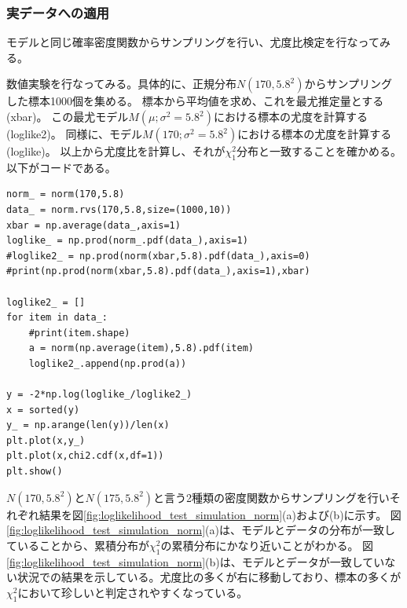 \subsubsection{実データへの適用}
モデルと同じ確率密度関数からサンプリングを行い、尤度比検定を行なってみる。

数値実験を行なってみる。具体的に、正規分布$N(170,5.8^2)$からサンプリングした標本1000個を集める。
標本から平均値を求め、これを最尤推定量とする(xbar)。
この最尤モデル$M(\mu;\sigma^2=5.8^2) $における標本の尤度を計算する(loglike2)。
同様に、モデル$M(170;\sigma^2=5.8^2)$における標本の尤度を計算する(loglike)。
以上から尤度比を計算し、それが$\chi^2_1$分布と一致することを確かめる。
以下がコードである。

\begin{lstlisting}
norm_ = norm(170,5.8)
data_ = norm.rvs(170,5.8,size=(1000,10))
xbar = np.average(data_,axis=1)
loglike_ = np.prod(norm_.pdf(data_),axis=1)
#loglike2_ = np.prod(norm(xbar,5.8).pdf(data_),axis=0)
#print(np.prod(norm(xbar,5.8).pdf(data_),axis=1),xbar)

loglike2_ = []
for item in data_:
    #print(item.shape)
    a = norm(np.average(item),5.8).pdf(item)
    loglike2_.append(np.prod(a))

y = -2*np.log(loglike_/loglike2_)
x = sorted(y)
y_ = np.arange(len(y))/len(x)
plt.plot(x,y_)
plt.plot(x,chi2.cdf(x,df=1))
plt.show()

\end{lstlisting}

$N(170,5.8^2)$と$N(175,5.8^2)$と言う2種類の密度関数からサンプリングを行いそれぞれ結果を図\ref{fig:loglikelihood_test_simulation_norm}(a)および(b)に示す。
図\ref{fig:loglikelihood_test_simulation_norm}(a)は、モデルとデータの分布が一致していることから、累積分布が$\chi^2_1$の累積分布にかなり近いことがわかる。
図\ref{fig:loglikelihood_test_simulation_norm}(b)は、モデルとデータが一致していない状況での結果を示している。尤度比の多くが右に移動しており、標本の多くが$\chi^2_1$において珍しいと判定されやすくなっている。


